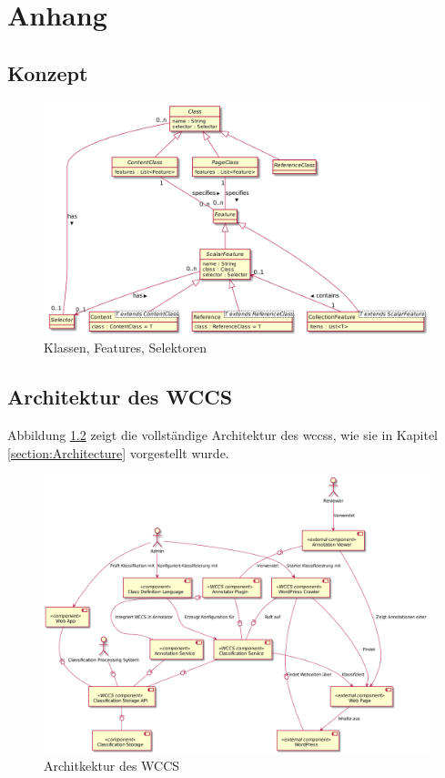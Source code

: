 \chapter{Anhang}

\section{Konzept}
    \begin{figure}[htb]
        \centering
        \includegraphics[scale=\imageScalingFactor]{../resources/concept/classes-features-selectors.png}
        \caption{Klassen, Features, Selektoren}
        \label{image:conceptClassesFeaturesSelectors}
    \end{figure}

\section{Architektur des WCCS}
    Abbildung \ref{image:wccsCompleteArchitecture} zeigt die vollständige Architektur des \glspl{wccs},
    wie sie in Kapitel \ref{section:Architecture} vorgestellt wurde.

    \begin{figure}[htb]
        \centering
        \includegraphics[scale=\imageScalingFactor]{../resources/architecture/complete_architecture.png}
        \caption{Architkektur des WCCS}
        \label{image:wccsCompleteArchitecture}
    \end{figure}

